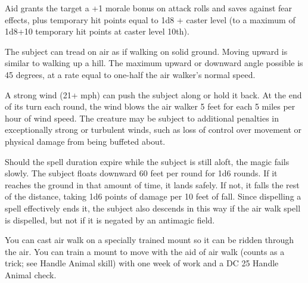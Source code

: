 \begin{multicols}{2}
\begin{small}
\noindent Aid grants the target a +1 morale bonus on attack rolls and saves against fear effects, plus temporary hit points equal to 1d8 + caster level (to a maximum of 1d8+10 temporary hit points at caster level 10th).

\noindent The subject can tread on air as if walking on solid ground. Moving upward is similar to walking up a hill. The maximum upward or downward angle possible is 45 degrees, at a rate equal to one-half the air walker's normal speed.

\smallskip\noindent A strong wind (21+ mph) can push the subject along or hold it back. At the end of its turn each round, the wind blows the air walker 5 feet for each 5 miles per hour of wind speed. The creature may be subject to additional penalties in exceptionally strong or turbulent winds, such as loss of control over movement or physical damage from being buffeted about.

\smallskip\noindent Should the spell duration expire while the subject is still aloft, the magic fails slowly. The subject floats downward 60 feet per round for 1d6 rounds. If it reaches the ground in that amount of time, it lands safely. If not, it falls the rest of the distance, taking 1d6 points of damage per 10 feet of fall. Since dispelling a spell effectively ends it, the subject also descends in this way if the air walk spell is dispelled, but not if it is negated by an antimagic field.

\smallskip\noindent You can cast air walk on a specially trained mount so it can be ridden through the air. You can train a mount to move with the aid of air walk (counts as a trick; see Handle Animal skill) with one week of work and a DC 25 Handle Animal check.


\end{small}
\end{multicols}
